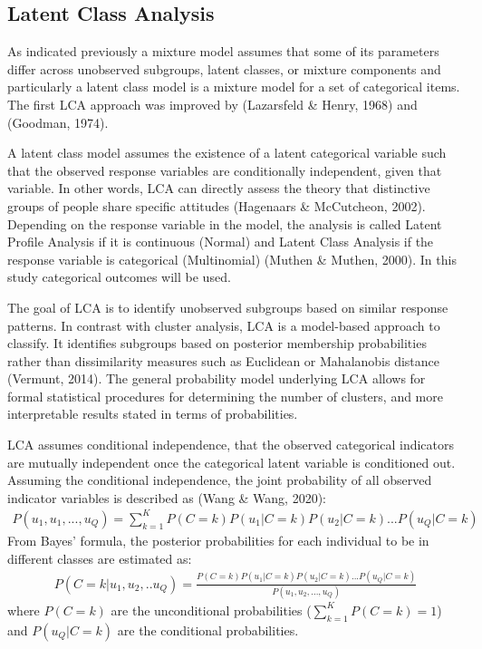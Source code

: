 \documentclass[12pt,a4paper,oneside]{reedthesis}
\begin{document}
\hypertarget{latent-class-analysis}{%
\subsection{Latent Class Analysis}\label{latent-class-analysis}}

As indicated previously a mixture model assumes that some of its parameters differ across unobserved subgroups, latent classes, or mixture components and particularly a latent class model is a mixture model for a set of categorical items. The first LCA approach was improved by (Lazarsfeld \& Henry, 1968) and (Goodman, 1974).

A latent class model assumes the existence of a latent categorical variable such that the observed response variables are conditionally independent, given that variable. In other words, LCA can directly assess the theory that distinctive groups of people share specific attitudes (Hagenaars \& McCutcheon, 2002). Depending on the response variable in the model, the analysis is called Latent Profile Analysis if it is continuous (Normal) and Latent Class Analysis if the response variable is categorical (Multinomial) (Muthen \& Muthen, 2000). In this study categorical outcomes will be used.

The goal of LCA is to identify unobserved subgroups based on similar response patterns. In contrast with cluster analysis, LCA is a model-based approach to classify. It identifies subgroups based on posterior membership probabilities rather than dissimilarity measures such as Euclidean or Mahalanobis distance (Vermunt, 2014). The general probability model underlying LCA allows for formal statistical procedures for determining the number of clusters, and more interpretable results stated in terms of probabilities.

LCA assumes conditional independence, that the observed categorical indicators are mutually independent once the categorical latent variable is conditioned out. Assuming the conditional independence, the joint probability of all observed indicator variables is described as (Wang \& Wang, 2020):
\begin{align}
P(u_1,u_1,...,u_Q)= \sum_{k=1}^K{P(C=k)P(u_1|C=k)P(u_2|C=k)...P(u_Q|C=k)} \label{eq01}
\end{align}
From Bayes' formula, the posterior probabilities for each individual to be in different classes are estimated as:
\begin{align}
P(C=k|u_1,u_2,..u_Q)=\frac{P(C=k)P(u_1|C=k)P(u_2|C=k)...P(u_Q|C=k)}{P(u_1,u_2,...,u_Q)} \label{eq02}
\end{align}
where \(P(C=k)\) are the unconditional probabilities (\(\sum_{k=1}^KP(C=k)=1\)) and \(P(u_Q|C=k)\) are the conditional probabilities.
\end{document}
